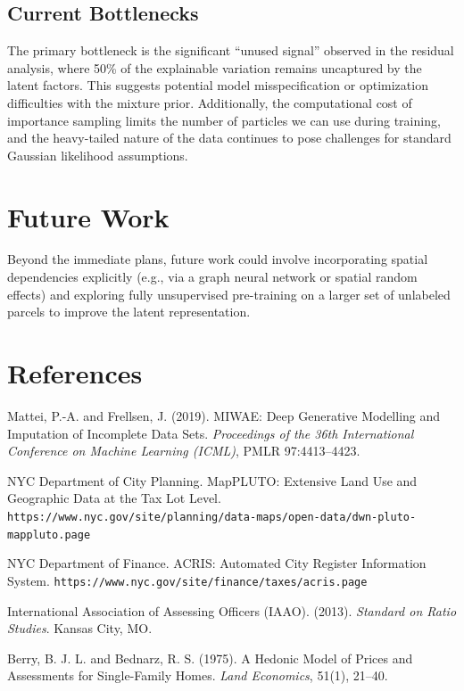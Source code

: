 \documentclass[11pt]{article}
\begin{document}
\subsection*{Current Bottlenecks}
The primary bottleneck is the significant ``unused signal'' observed in the residual analysis, where 50\% of the explainable variation remains uncaptured by the latent factors. This suggests potential model misspecification or optimization difficulties with the mixture prior. Additionally, the computational cost of importance sampling limits the number of particles we can use during training, and the heavy-tailed nature of the data continues to pose challenges for standard Gaussian likelihood assumptions.

\section*{Future Work}
Beyond the immediate plans, future work could involve incorporating spatial dependencies explicitly (e.g., via a graph neural network or spatial random effects) and exploring fully unsupervised pre-training on a larger set of unlabeled parcels to improve the latent representation.

\section*{References}

\begin{enumerate}[label={[\arabic*]}, leftmargin=*, itemsep=0pt]
    \item Mattei, P.-A. and Frellsen, J. (2019). MIWAE: Deep Generative Modelling and Imputation of Incomplete Data Sets. \textit{Proceedings of the 36th International Conference on Machine Learning (ICML)}, PMLR 97:4413--4423.
    \item NYC Department of City Planning. MapPLUTO: Extensive Land Use and Geographic Data at the Tax Lot Level. \texttt{https://www.nyc.gov/site/planning/data-maps/open-data/dwn-pluto-mappluto.page}
    \item NYC Department of Finance. ACRIS: Automated City Register Information System. \texttt{https://www.nyc.gov/site/finance/taxes/acris.page}
    \item International Association of Assessing Officers (IAAO). (2013). \textit{Standard on Ratio Studies}. Kansas City, MO.
    \item Berry, B. J. L. and Bednarz, R. S. (1975). A Hedonic Model of Prices and Assessments for Single-Family Homes. \textit{Land Economics}, 51(1), 21--40.
\end{enumerate}
\end{document}
